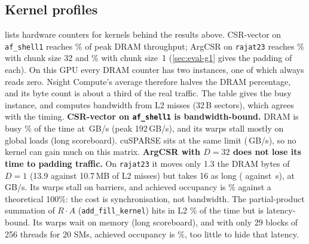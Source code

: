 \subsection{Kernel profiles}
\begin{table}[t]
\centering\small
\caption{Nsight Compute metrics of representative kernels (ncu locks clocks, so these are not timings).}\label{tab:ncu}
\end{table}
 lists hardware counters for kernels behind the results above. CSR-vector on \texttt{af\_shell1}
reaches \% of peak DRAM throughput; ArgCSR on \texttt{rajat23} reaches
\% with chunk size 32 and \% with
chunk size~1 (\cref{sec:eval-g1} gives the padding of each).
On this GPU every DRAM counter has two instances, one of which always reads zero. Nsight Compute's average therefore
halves the DRAM percentage, and its byte count is about a third of the real traffic. The table gives the busy
instance, and computes bandwidth from L2 misses (32\,B sectors), which agrees with the timing.
\textbf{CSR-vector on \texttt{af\_shell1} is bandwidth-bound.} DRAM is busy \%
of the time at \,GB/s (peak 192\,GB/s), and its warps stall mostly on
global loads (long scoreboard). cuSPARSE sits at the same limit (\,GB/s), so no
kernel can gain much on this matrix.
\textbf{ArgCSR with $D=32$ does not lose its time to padding traffic.} On \texttt{rajat23} it moves only 1.3\x{} the
DRAM bytes of $D=1$ (13.9 against 10.7\,MB of L2 misses) but takes 16\x{} as long
( against \,\textmu s), at
\,GB/s. Its warps stall on barriers, and achieved occupancy is
\% against a theoretical 100\%: the cost is synchronisation, not bandwidth.
The partial-product summation of $R\cdot A$ (\texttt{add\_fill\_kernel}) hits in L2
\% of the time but is latency-bound. Its warps wait on memory (long scoreboard),
and with only 29 blocks of 256 threads for 20 SMs, achieved occupancy is \%, too
little to hide that latency.
